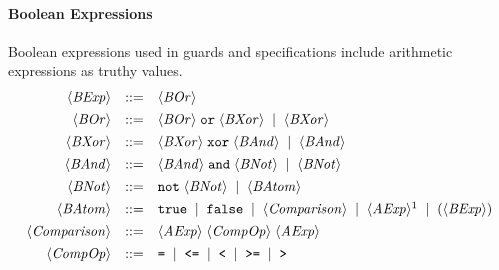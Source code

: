 \documentclass{article}
\begin{document}
\paragraph{Boolean Expressions}
Boolean expressions used in guards and specifications include arithmetic expressions as truthy values.
\[
\begin{array}{rcl}
\langle \mathit{BExp} \rangle
&::=&
\langle \mathit{BOr} \rangle \\[4pt]

\langle \mathit{BOr} \rangle
&::=&
\langle \mathit{BOr} \rangle\;\mathtt{or}\;\langle \mathit{BXor} \rangle
\;\mid\;
\langle \mathit{BXor} \rangle \\[4pt]

\langle \mathit{BXor} \rangle
&::=&
\langle \mathit{BXor} \rangle\;\mathtt{xor}\;\langle \mathit{BAnd} \rangle
\;\mid\;
\langle \mathit{BAnd} \rangle \\[4pt]

\langle \mathit{BAnd} \rangle
&::=&
\langle \mathit{BAnd} \rangle\;\mathtt{and}\;\langle \mathit{BNot} \rangle
\;\mid\;
\langle \mathit{BNot} \rangle \\[4pt]

\langle \mathit{BNot} \rangle
&::=&
\mathtt{not}\;\langle \mathit{BNot} \rangle
\;\mid\;
\langle \mathit{BAtom} \rangle \\[4pt]

\langle \mathit{BAtom} \rangle
&::=&
\mathtt{true}
\;\mid\;
\mathtt{false}
\;\mid\;
\langle \mathit{Comparison} \rangle
\;\mid\;
\langle \mathit{AExp} \rangle \footnotemark
\;\mid\;
(\langle \mathit{BExp} \rangle) \\[4pt]

\langle \mathit{Comparison} \rangle
&::=&
\langle \mathit{AExp} \rangle\;\langle \mathit{CompOp} \rangle\;\langle \mathit{AExp} \rangle \\[4pt]

\langle \mathit{CompOp} \rangle
&::=&
\texttt{=}
\;\mid\;
\texttt{<=}
\;\mid\;
\texttt{<}
\;\mid\;
\texttt{>=}
\;\mid\;
\texttt{>}
\end{array}
\]

\end{document}
